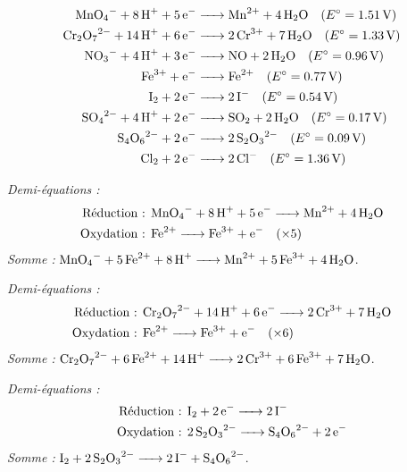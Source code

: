 \documentclass[11pt]{article}
\begin{document}
\begin{aretenir}
\begin{align*}
\ce{MnO4- + 8H+ + 5e- &-> Mn^2+ + 4H2O} \quad (E^\circ = \SI{1,51}{V}) \\
\ce{Cr2O7^2- + 14H+ + 6e- &-> 2Cr^3+ + 7H2O} \quad (E^\circ = \SI{1,33}{V}) \\
\ce{NO3- + 4H+ + 3e- &-> NO + 2H2O} \quad (E^\circ = \SI{0,96}{V}) \\
\ce{Fe^3+ + e- &-> Fe^2+} \quad (E^\circ = \SI{0,77}{V}) \\
\ce{I2 + 2e- &-> 2I-} \quad (E^\circ = \SI{0,54}{V}) \\
\ce{SO4^2- + 4H+ + 2e- &-> SO2 + 2H2O} \quad (E^\circ = \SI{0,17}{V}) \\
\ce{S4O6^2- + 2e- &-> 2S2O3^2-} \quad (E^\circ = \SI{0,09}{V}) \\
\ce{Cl2 + 2e- &-> 2Cl-} \quad (E^\circ = \SI{1,36}{V})
\end{align*}
\end{aretenir}

\begin{exoresolu}
\emph{Demi-équations :}
\begin{align*}
\text{Réduction : } & \ce{MnO4- + 8H+ + 5e- -> Mn^2+ + 4H2O} \\
\text{Oxydation : } & \ce{Fe^2+ -> Fe^3+ + e-} \quad (\times 5)
\end{align*}
\emph{Somme :} $\ce{MnO4- + 5Fe^2+ + 8H+ -> Mn^2+ + 5Fe^3+ + 4H2O}$.
\end{exoresolu}

\begin{exoresolu}
\emph{Demi-équations :}
\begin{align*}
\text{Réduction : } & \ce{Cr2O7^2- + 14H+ + 6e- -> 2Cr^3+ + 7H2O} \\
\text{Oxydation : } & \ce{Fe^2+ -> Fe^3+ + e-} \quad (\times 6)
\end{align*}
\emph{Somme :} $\ce{Cr2O7^2- + 6Fe^2+ + 14H+ -> 2Cr^3+ + 6Fe^3+ + 7H2O}$.
\end{exoresolu}

\begin{exoresolu}
\emph{Demi-équations :}
\begin{align*}
\text{Réduction : } & \ce{I2 + 2e- -> 2I-} \\
\text{Oxydation : } & \ce{2S2O3^2- -> S4O6^2- + 2e-}
\end{align*}
\emph{Somme :} $\ce{I2 + 2S2O3^2- -> 2I- + S4O6^2-}$.
\end{exoresolu}
\end{document}
